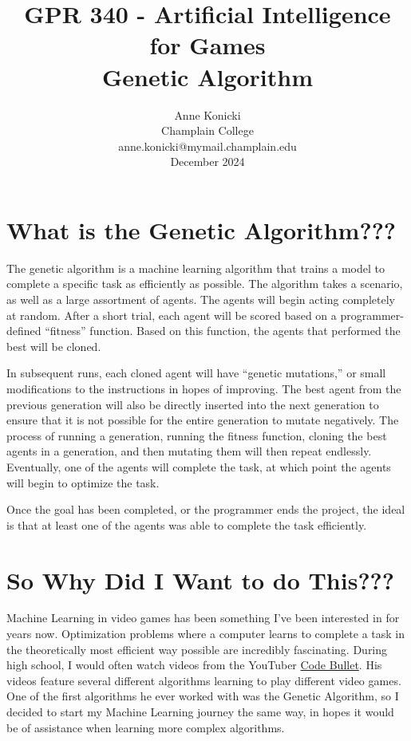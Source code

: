 \documentclass[twoside]{article}
\date{}
\begin{document}
    \title{GPR 340 - Artificial Intelligence for Games \\ Genetic Algorithm }
    \author{Anne Konicki \\ Champlain College \\ anne.konicki@mymail.champlain.edu \\ December 2024 }
    \maketitle


    \section{What is the Genetic Algorithm???}\label{sec:what-is-the-genetic-algorithm}
    The genetic algorithm is a machine learning algorithm that trains a model to complete a specific task as efficiently as possible.
    The algorithm takes a scenario, as well as a large assortment of agents.
    The agents will begin acting completely at random.
    After a short trial, each agent will be scored based on a programmer-defined ``fitness'' function.
    Based on this function, the agents that performed the best will be cloned.

    \bigbreak
    \noindent
    In subsequent runs, each cloned agent will have ``genetic mutations,'' or small modifications to the instructions in hopes of improving.
    The best agent from the previous generation will also be directly inserted into the next generation to ensure that it is not possible for the entire generation to mutate negatively.
    The process of running a generation, running the fitness function, cloning the best agents in a generation, and then mutating them will then repeat endlessly.
    Eventually, one of the agents will complete the task, at which point the agents will begin to optimize the task.

    \bigbreak
    \noindent
    Once the goal has been completed, or the programmer ends the project, the ideal is that at least one of the agents was able to complete the task efficiently.

    \section{So Why Did I Want to do This???}\label{sec:so-why-did-i-want-to-do-this?}
    Machine Learning in video games has been something I've been interested in for years now.
    Optimization problems where a computer learns to complete a task in the theoretically most efficient way possible are incredibly fascinating.
    During high school, I would often watch videos from the YouTuber \href{https://www.youtube.com/@CodeBullet/featured}{Code Bullet}.
    His videos feature several different algorithms learning to play different video games.
    One of the first algorithms he ever worked with was the Genetic Algorithm, so I decided to start my Machine Learning journey the same way, in hopes it would be of assistance when learning more complex algorithms.
\end{document}
